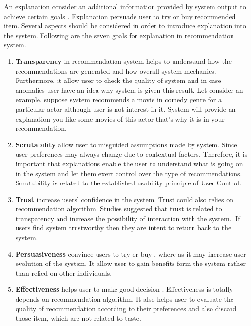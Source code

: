 An explanation consider an additional information provided by system output to achieve certain goals \cite{tintarev2011designing}. Explanation persuade user to try or buy recommended item\cite{tintarev2012evaluating}. Several aspects should be considered in order to introduce explanation into the system. Following are the seven goals for explanation in recommendation system\cite{tintarev2007survey}.

\begin{enumerate}
	\item \textbf{Transparency} in recommendation system helps to understand how the recommendations are generated and how overall system mechanics\cite{tintarev2007survey}. Furthermore, it allow user to check the quality of system and in case anomalies user have an idea why system is given this result. Let consider an example, suppose system recommends a movie in comedy genre for a particular actor although user is not interest in it. System will provide an explanation you like some movies of this actor that’s why it is in your recommendation.
	
	\item \textbf{Scrutability} allow user to misguided assumptions made by system. Since user preferences may always change due to contextual factors. Therefore, it is important that explanations enable the user to understand what is going on in the system and let them exert control over the type of recommendations. Scrutability is related to the established usability principle of User Control\cite{nielsen1990heuristic}.
	
	\item \textbf{Trust} increase users’ confidence in the system\cite{tintarev2007survey}. Trust could also relies on recommendation algorithm\cite{ mcnee2003interfaces}. Studies suggested that trust is related to transparency and increase the possibility of interaction with the system.\cite{ elfernig2006empirical}. If users find system trustworthy then they are intent to return back to the system\cite{felfernig2006empirical}. 
	
	\item \textbf{Persuasiveness} convince users to try or buy \cite{tintarev2007survey}, where as it may increase user evolution of the system. It allow user to gain benefits form the system rather than relied on other individuals.

	\item \textbf{Effectiveness} helps user to make good decision \cite{tintarev2007survey}. Effectiveness is totally depends on recommendation algorithm. It also helps user to evaluate the quality of recommendation according to their preferences and also discard those item, which are not related to taste.  
	

\end{enumerate}
